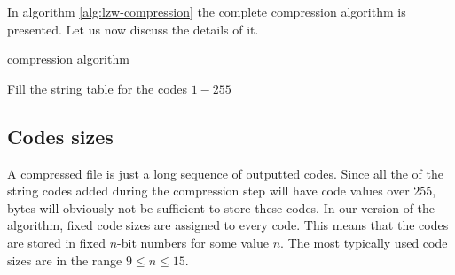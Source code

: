 In algorithm \ref{alg:lzw-compression} the complete \lzw compression
algorithm is presented. Let us now discuss the details of it.

\begin{algorithm}[H]
  \caption{\lzw compression algorithm}
  \label{alg:lzw-compression}
  \begin{algorithmic}[1]


    \State Fill the string table for the codes $1-255$
     

    \While{\neof}

       \label{algl:hasingcheckintable}

      \Else

        \State {}

          

          \State {}\label{algl:hashadd}

        \EndIf


      \EndIf


    \EndWhile

    \State {}
    \State {}
  \end{algorithmic}
\end{algorithm}

\subsection{Codes sizes}

A \lzw compressed file is just a long sequence of outputted codes.
Since all the of the string codes added during the compression step
will have code values over $255$, bytes will obviously not be
sufficient to store these codes. In our version of the \lzw algorithm,
fixed code sizes are assigned to every code. This means that the codes
are stored in fixed $n$-bit numbers for some value $n$. The most
typically used code sizes are in the range $9 \leq n \leq 15$.


